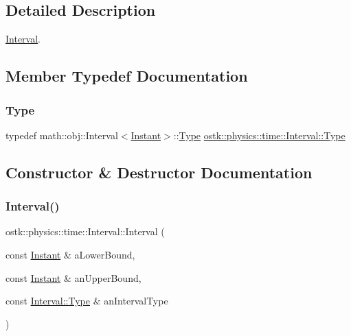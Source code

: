 \subsection{Detailed Description}
\hyperlink{classostk_1_1physics_1_1time_1_1_interval}{Interval}. 

\subsection{Member Typedef Documentation}
\mbox{\label{classostk_1_1physics_1_1time_1_1_interval_a7011137ee6d84ebb8705c95d88f87818}} 
\subsubsection{\texorpdfstring{Type}{Type}}
{\footnotesize\ttfamily typedef math\+::obj\+::\+Interval$<$\hyperlink{classostk_1_1physics_1_1time_1_1_instant}{Instant}$>$\+::\hyperlink{classostk_1_1physics_1_1time_1_1_interval_a7011137ee6d84ebb8705c95d88f87818}{Type} \hyperlink{classostk_1_1physics_1_1time_1_1_interval_a7011137ee6d84ebb8705c95d88f87818}{ostk\+::physics\+::time\+::\+Interval\+::\+Type}}



\subsection{Constructor \& Destructor Documentation}
\mbox{\label{classostk_1_1physics_1_1time_1_1_interval_a62d60b1eb3c7c782d7c45e8b9c153b34}} 
\subsubsection{\texorpdfstring{Interval()}{Interval()}}
{\footnotesize\ttfamily ostk\+::physics\+::time\+::\+Interval\+::\+Interval (\begin{DoxyParamCaption}\item[{const \hyperlink{classostk_1_1physics_1_1time_1_1_instant}{Instant} \&}]{a\+Lower\+Bound,  }\item[{const \hyperlink{classostk_1_1physics_1_1time_1_1_instant}{Instant} \&}]{an\+Upper\+Bound,  }\item[{const \hyperlink{classostk_1_1physics_1_1time_1_1_interval_a7011137ee6d84ebb8705c95d88f87818}{Interval\+::\+Type} \&}]{an\+Interval\+Type }\end{DoxyParamCaption})}



